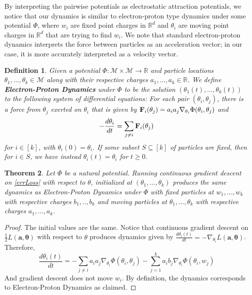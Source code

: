 \documentclass{article}
\newtheorem{theorem}{Theorem}[section]
\newtheorem{definition}[theorem]{Definition}
\newcommand{\R}{{\mathbb{R}}}
\begin{document}
By interpreting the pairwise potentials as electrostatic attraction
potentials, we notice that our dynamics is similar to electron-proton
type dynamics under some potential $\Phi$, where $w_i$ are fixed point
charges in $\R^d$ and $\theta_i$ are moving point charges in $\R^d$
that are trying to find $w_i$. We note that standard electron-proton dynamics interprets the force between particles as an acceleration vector; in our case, it is more accurately interpreted as a velocity vector. 
%
\begin{definition}\label{EPDef}
  Given a potential $\Phi : \mathcal{M} \times \mathcal{M} \to \R$ and
  particle locations $\theta_1,...,\theta_k \in \mathcal{M}$ along
  with their respective charges $a_1,...,a_k \in \R$. We define {\bf
    Electron-Proton Dynamics} under $\Phi$ to be the solution
  $(\theta_1(t),...,\theta_k(t))$ to the following system of
  differential equations: For each pair $(\theta_i,\theta_j)$, there
  is a force from $\theta_j$ exerted on $\theta_i$ that is given by
  ${\bf F}_{i}(\theta_j) = a_ia_j\nabla_{\theta_i}
  \Phi(\theta_i,\theta_j)$ and
\[-\frac{d\theta_i}{dt} =  \sum_{ j \neq i} {\bf F}_{i}(\theta_j)\]
for $i \in [k]$, with $\theta_i(0) = \theta_i$. If some subset $S \subseteq [k]$ of particles are fixed, then for $i\in S$, we have instead $\theta_i(t) = \theta_i$ for $t \geq 0$.
\end{definition}
%
\begin{theorem}\label{EPDyn}
Let $\Phi$ be a natural potential. Running continuous gradient descent on \eqref{errLoss} with respect to $\theta$, initialized at $(\theta_1,...,\theta_k)$ produces the same dynamics as Electron-Proton Dynamics under $\Phi$ with fixed particles at $w_1,...,w_k$ with respective charges $b_1,..,b_k$ and moving particles at $\theta_1,...,\theta_k$ with respective charges $a_1,...,a_k$.
\end{theorem}
%
\begin{proof}
The initial values are the same. Notice that continuous gradient descent on $\frac{1}{2}L(\boldsymbol{a,\theta})$ with respect to $\theta$ produces dynamics given by $\frac{d\theta_i(t)}{dt} = -\nabla_{\theta_i}L(\boldsymbol{a,\theta})$. Therefore,
\[\frac{d\theta_i(t)}{dt} = -\sum_{j \neq i} a_i a_j \nabla_{\theta_i}\Phi(\theta_i,\theta_j) - \sum_{j=1}^k a_ib_j\nabla_{\theta_i} \Phi(\theta_i,w_j)\]
And gradient descent does not move $w_i$. By definition, the dynamics corresponds to Electron-Proton Dynamics as claimed.
\end{proof}
\end{document}
